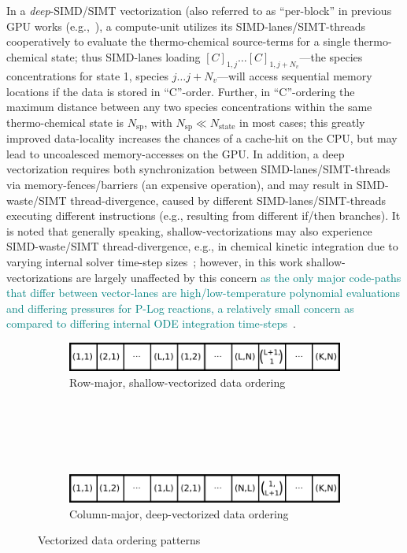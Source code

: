 \documentclass[12pt,number,sort&compress,preprint]{elsarticle}
\newcommand{\add}[1]{{\sloppy\textcolor{teal}{#1}}}  %
\begin{document}
In a \textit{deep}-SIMD\slash SIMT vectorization (also referred to as ``per-block'' in previous GPU works (e.g.,~\cite{Stone:2013aa,CurtisGPU:2017}), a compute-unit utilizes its SIMD-lanes\slash SIMT-threads cooperatively to evaluate the thermo-chemical source-terms for a single thermo-chemical state; thus SIMD-lanes loading $[C]_{1, j} \ldots [C]_{1, j + N_v}$---the species concentrations for state 1, species $j \ldots j + N_v$---will access sequential memory locations if the data is stored in ``C''-order.
Further, in ``C''-ordering the maximum distance between any two species concentrations within the same thermo-chemical state is $N_{\text{sp}}$, with $N_{\text{sp}} \ll N_{\text{state}}$ in most cases; this greatly improved data-locality increases the chances of a cache-hit on the CPU, but may lead to uncoalesced memory-accesses on the GPU.
In addition, a deep vectorization requires both synchronization between SIMD-lanes\slash SIMT-threads via memory-fences\slash barriers (an expensive operation), and may result in SIMD-waste\slash SIMT thread-divergence, caused by different SIMD-lanes\slash SIMT-threads executing different instructions (e.g., resulting from different if\slash then branches).
It is noted that generally speaking, shallow-vectorizations may also experience SIMD-waste\slash SIMT thread-divergence, e.g., in chemical kinetic integration due to varying internal solver time-step sizes~\cite{CurtisGPU:2017}; however, in this work shallow-vectorizations are largely unaffected by this concern \add{as the only major code-paths that differ between vector-lanes are high\slash low-temperature polynomial evaluations and differing pressures for P-Log reactions, a relatively small concern as compared to differing internal ODE integration time-steps~\cite{CurtisGPU:2017}}.

\begin{figure}[htb]
  \centering
  \begin{minipage}{0.6\linewidth}
    \begin{subfigure}[t]{\textwidth}
	\includegraphics[width=\textwidth]{row_major_split.pdf}
	\caption{Row-major, shallow-vectorized data ordering}
	\label{F:row_major_split}
    \end{subfigure}
    \\
    \\
    \\
    \\
    \begin{subfigure}[t]{\textwidth}
	\includegraphics[width=\textwidth]{column_major_split.pdf}
	\caption{Column-major, deep-vectorized data ordering}
	\label{F:column_major_split}
    \end{subfigure}
  \end{minipage}
  \caption{Vectorized data ordering patterns}
  \label{F:vector_data}
\end{figure}
\end{document}

